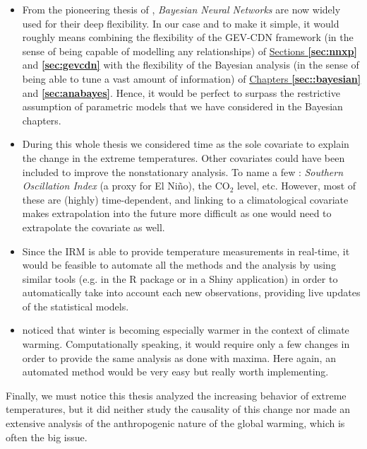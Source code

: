 \documentclass[11pt,a4paper,openany, twosided]{book}
\begin{document}
\begin{itemize} 
\item From the pioneering thesis of \citet{Neal_1996_bay}, \emph{Bayesian Neural Networks} are now widely used for their deep flexibility. In our case and to make it simple, it would roughly means combining the flexibility of the GEV-CDN framework (in the sense of being capable of modelling any relationships)  of \hyperref[sec:nnxp]{Sections \textbf{\ref{sec:nnxp}}} and \hyperref[sec:gevcdn]{ \textbf{\ref{sec:gevcdn}}} with the flexibility of the  Bayesian analysis (in the sense of being able to tune a vast amount of information) of \hyperref[sec::bayesian]{ Chapters \textbf{\ref{sec::bayesian}}} and \textbf{\ref{sec:anabayes}}. Hence, it would be perfect to surpass the restrictive assumption of parametric models that we have considered in the Bayesian chapters.


\item During this whole thesis we considered time as the sole covariate to explain the change in the extreme temperatures. Other covariates could have been included to improve the nonstationary analysis. To name a few : \emph{Southern Oscillation Index} (a proxy for El Niño), the $\text{CO}_2$ level, etc.
However, most of these are (highly) time-dependent, and linking to a climatological covariate makes
extrapolation into the future more difficult as one would need to extrapolate the covariate as well. 

\item Since the IRM is able to provide temperature measurements in real-time, it would be feasible to automate all the methods and the analysis by using similar tools (e.g. in the R package or in a Shiny application) in order to automatically take into account each new observations, providing live updates of the statistical models.

\item \citet{Ribes2017} noticed that winter is becoming especially warmer in the context of climate warming.
Computationally speaking, it would require only a few changes in order to provide the same analysis as done with maxima. Here again, an automated method would be very easy but really worth implementing.
\end{itemize}

Finally, we must notice this thesis analyzed the increasing behavior of extreme temperatures, but it did neither study the causality of this change nor made an extensive analysis of the anthropogenic nature of the global warming, which is often the big issue.
\end{document}
